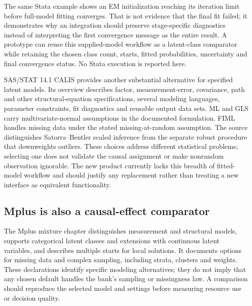 The same Stata example shows an EM initialization reaching its iteration
limit before full-model fitting converges. That is not evidence that the
final fit failed; it demonstrates why an integration should preserve
stage-specific diagnostics instead of interpreting the first convergence
message as the entire result. A prototype can reuse this supplied-model
workflow as a latent-class comparator while retaining the chosen class
count, starts, fitted probabilities, uncertainty and final convergence
status. No Stata execution is reported here.
\citep[pp.3--5]{exec13_latent_stata_lca}

SAS/STAT 14.1 CALIS provides another substantial alternative for
specified latent models. Its overview describes factor,
measurement-error, covariance, path and other structural-equation
specifications, several modeling languages, parameter constraints, fit
diagnostics and reusable output data sets. ML and GLS carry
multivariate-normal assumptions in the documented formulation. FIML
handles missing data under the stated missing-at-random assumption. The
source distinguishes Satorra--Bentler scaled inference from the separate
robust procedure that downweights outliers. These choices address
different statistical problems; selecting one does not validate the
causal assignment or make nonrandom observation ignorable. The new
product currently lacks this breadth of fitted-model workflow and should
justify any replacement rather than treating a new interface as
equivalent functionality. \citep{exec13_latent_sas_calis}

\hypertarget{mplus-is-also-a-causal-effect-comparator}{%
\subsection{Mplus is also a causal-effect
comparator}\label{mplus-is-also-a-causal-effect-comparator}}

The Mplus mixture chapter distinguishes measurement and structural
models, supports categorical latent classes and extensions with
continuous latent variables, and describes multiple starts for local
solutions. It documents options for missing data and complex sampling,
including strata, clusters and weights. These declarations identify
specific modeling alternatives; they do not imply that any chosen
default handles the bank's sampling or missingness law. A comparison
should reproduce the selected model and settings before measuring
resource use or decision quality.
\citep[pp.165--171]{exec13_latent_mplus}

